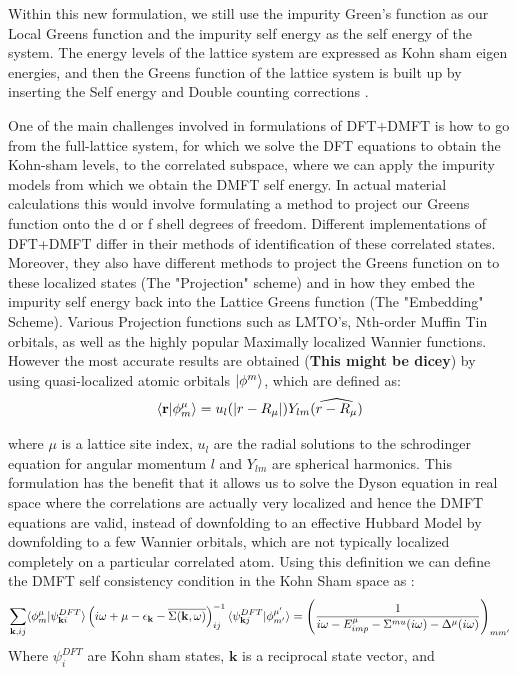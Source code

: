 \documentclass[10pt]{ruthesis}
\begin{document}
 Within this new formulation, we still use the impurity Green's function as our Local Greens function and the impurity self energy as the self energy of the system. The energy levels of the lattice system are expressed as Kohn sham eigen energies, and then the Greens function of the lattice system is built up by inserting the Self energy and Double counting corrections . 
 
One of the main challenges involved in formulations of DFT+DMFT is how to go from the full-lattice system, for which we solve the DFT equations to obtain the Kohn-sham levels, to the correlated subspace, where we can apply the impurity models from which we obtain the DMFT self energy. In actual material calculations this would involve formulating a method to project our Greens function onto the d or f shell degrees of freedom. Different implementations of DFT+DMFT differ in their methods of identification of these correlated states. Moreover, they also have different methods to project the Greens function on to these localized states (The "Projection" scheme) and in how they embed the impurity self energy back into the Lattice Greens function (The "Embedding" Scheme). Various Projection functions such as LMTO's, Nth-order Muffin Tin orbitals, as well as the highly popular Maximally localized Wannier functions. However the most accurate results are obtained (\textbf{This might be dicey}) by using quasi-localized atomic orbitals $|\phi^m \rangle$, which are defined as:
\begin{equation}\label{Projector}
\langle \mathbf{r} |\phi_m^\mu \rangle= u_l(|r-R_\mu|) Y_{lm}(\widehat{r-R_\mu})
\end{equation}

where $\mu$ is a lattice site index, $u_l$ are the radial solutions to the schrodinger equation for angular momentum $l$ and  $Y_{lm}$ are spherical harmonics. This formulation has the benefit that it allows us to solve the Dyson equation in real space where the correlations are actually very localized and hence the DMFT equations are valid, instead of downfolding to an effective Hubbard Model by  downfolding to a few Wannier orbitals, which are not typically localized completely on a particular correlated atom. Using this definition we can define the  DMFT self consistency condition in the Kohn Sham space as :
\begin{equation}\label{DFT+DMFT SC}
\sum_{\mathbf{k},ij} \langle \phi^\mu_m|\psi^{DFT}_{\mathbf{k} i} \rangle \left( i\omega +\mu -\epsilon_{\mathbf{k}} -\overline{\Sigma(\mathbf{k} ,\omega)} \right)^{-1}_{ij}\langle\psi^{DFT}_{\mathbf{k} j}  |\phi^{\mu'}_{m'} \rangle = \left( \dfrac{1}{i\omega -E^{\mu}_{imp}-\Sigma^{mu}(i\omega)-\Delta^{\mu}(i\omega)} \right) _{mm'}
\end{equation}
Where $\psi^{DFT}_i$ are Kohn sham states, $\mathbf{k}$ is a reciprocal state vector, and 
\end{document}
